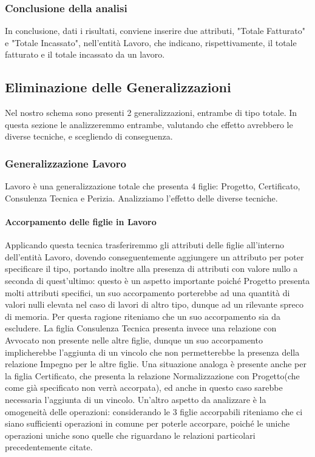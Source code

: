 \documentclass{elegantbook}
\begin{document}
        
        \subsubsection{Conclusione della analisi}
        In conclusione, dati i risultati, conviene inserire due attributi, "Totale Fatturato"
        e "Totale Incassato", nell'entità Lavoro, che indicano, rispettivamente, il totale fatturato
        e il totale incassato da un lavoro.
	
	\subsection{Eliminazione delle Generalizzazioni}
	Nel nostro schema sono presenti 2 generalizzazioni, entrambe di tipo totale. In questa sezione le analizzeremmo entrambe, valutando che effetto avrebbero le diverse tecniche, e scegliendo di conseguenza.
		\subsubsection{Generalizzazione Lavoro}
			Lavoro è una generalizzazione totale che presenta 4 figlie: Progetto, Certificato, Consulenza Tecnica e Perizia. Analizziamo l'effetto delle diverse tecniche.
			\paragraph{Accorpamento delle figlie in Lavoro}
				Applicando questa tecnica trasferiremmo gli attributi delle figlie all'interno dell'entità Lavoro, dovendo conseguentemente aggiungere un attributo per poter specificare il tipo, portando inoltre alla presenza di attributi con valore nullo a seconda di quest'ultimo: questo è un aspetto importante poiché Progetto presenta molti attributi specifici, un suo accorpamento porterebbe ad una quantità di valori nulli elevata nel caso di lavori di altro tipo, dunque ad un rilevante spreco di memoria. Per questa ragione riteniamo che un suo accorpamento sia da escludere. La figlia Consulenza Tecnica presenta invece una relazione con Avvocato non presente nelle altre figlie, dunque un suo accorpamento implicherebbe l'aggiunta di un vincolo che non permetterebbe la presenza della relazione Impegno per le altre figlie. Una situazione analoga è presente anche per la figlia Certificato, che presenta la relazione Normalizzazione con Progetto(che come già specificato non verrà accorpata), ed anche in questo caso sarebbe necessaria l'aggiunta di un vincolo. Un'altro aspetto da analizzare è la omogeneità delle operazioni: considerando le 3 figlie accorpabili riteniamo che ci siano sufficienti operazioni in comune per poterle accorpare, poiché le uniche operazioni uniche sono quelle che riguardano le relazioni particolari precedentemente citate.
			
\end{document}
